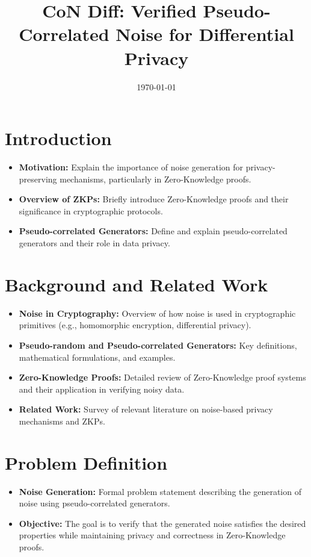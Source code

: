 \documentclass[11pt]{article}
\newcommand{\myname}{Lev Stambler}
\begin{document}
\title{CoN Diff: Verified Pseudo-Correlated Noise for Differential Privacy}


\date{\today}
\maketitle




\section{Introduction}
\begin{itemize}
    \item \textbf{Motivation:} Explain the importance of noise generation for privacy-preserving mechanisms, particularly in Zero-Knowledge proofs.
    \item \textbf{Overview of ZKPs:} Briefly introduce Zero-Knowledge proofs and their significance in cryptographic protocols.
    \item \textbf{Pseudo-correlated Generators:} Define and explain pseudo-correlated generators and their role in data privacy.
\end{itemize}

\section{Background and Related Work}
\begin{itemize}
    \item \textbf{Noise in Cryptography:} Overview of how noise is used in cryptographic primitives (e.g., homomorphic encryption, differential privacy).
    \item \textbf{Pseudo-random and Pseudo-correlated Generators:} Key definitions, mathematical formulations, and examples.
    \item \textbf{Zero-Knowledge Proofs:} Detailed review of Zero-Knowledge proof systems and their application in verifying noisy data.
    \item \textbf{Related Work:} Survey of relevant literature on noise-based privacy mechanisms and ZKPs.
\end{itemize}

\section{Problem Definition}
\begin{itemize}
    \item \textbf{Noise Generation:} Formal problem statement describing the generation of noise using pseudo-correlated generators.
    \item \textbf{Objective:} The goal is to verify that the generated noise satisfies the desired properties while maintaining privacy and correctness in Zero-Knowledge proofs.
\end{itemize}
\end{document}
